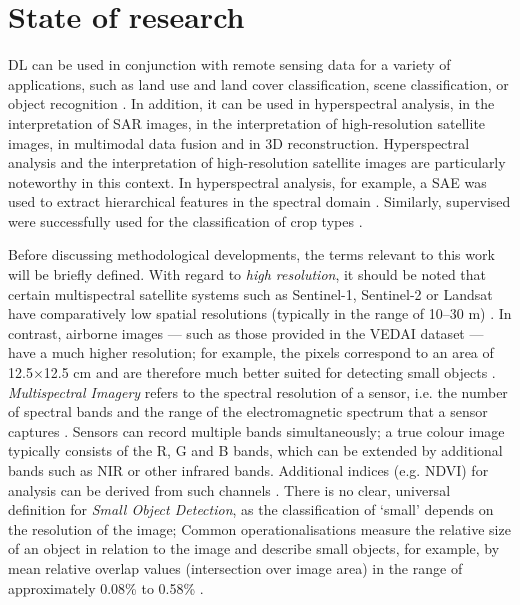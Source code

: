 \chapter{State of research}
\label{ch:state_of_research}


\acrlong{DL} can be used in conjunction with remote sensing data for a variety of applications, such as land use and land cover classification, scene classification, or object recognition \cite{Zhu2017}. In addition, it can be used in hyperspectral analysis, in the interpretation of \acrshort{SAR} images, in the interpretation of high-resolution satellite images, in multimodal data fusion and in 3D reconstruction. Hyperspectral analysis and the interpretation of high-resolution satellite images are particularly noteworthy in this context. In hyperspectral analysis, for example, a \acrlong{SAE} was used to extract hierarchical features in the spectral domain \cite{Chen2014}. Similarly, supervised  were successfully used for the classification of crop types \cite{Kussul2017}.

Before discussing methodological developments, the terms relevant to this work will be briefly defined. With regard to \emph{high resolution}, it should be noted that certain multispectral satellite systems such as Sentinel-1, Sentinel-2 or Landsat have comparatively low spatial resolutions (typically in the range of 10–30 m) \cite{Wieland2023}. In contrast, airborne images — such as those provided in the \acrshort{VEDAI} dataset — have a much higher resolution; for example, the pixels correspond to an area of 12.5\(\times\)12.5 cm and are therefore much better suited for detecting small objects \cite{Razakarivony2015}. \emph{Multispectral Imagery} refers to the spectral resolution of a sensor, i.e. the number of spectral bands and the range of the electromagnetic spectrum that a sensor captures \cite{Khan2018}. Sensors can record multiple bands simultaneously; a true colour image typically consists of the \Acrfull{R}, \Acrfull{G} and \Acrfull{B} bands, which can be extended by additional bands such as \acrfull{NIR} or other infrared bands. Additional indices (e.g. \acrfull{NDVI}) for analysis can be derived from such channels \cite{Wiley2018}. There is no clear, universal definition for \emph{Small Object Detection}, as the classification of ‘small’ depends on the resolution of the image; Common operationalisations measure the relative size of an object in relation to the image and describe small objects, for example, by mean relative overlap values (intersection over image area) in the range of approximately 0.08\% to 0.58\% \cite{Chen2017}.

